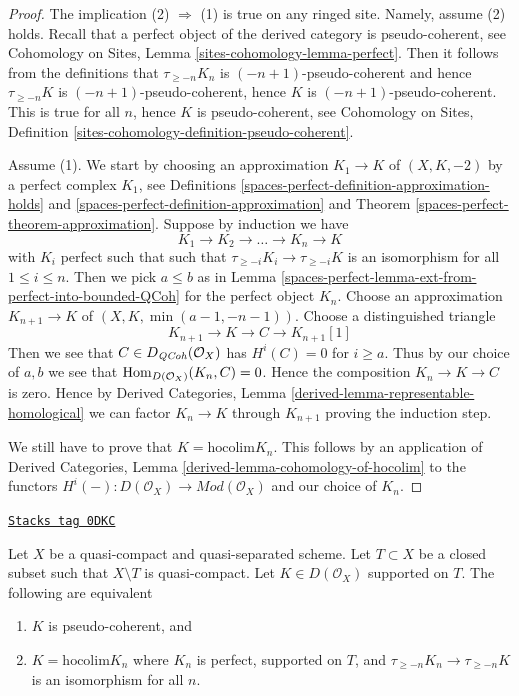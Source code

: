 \begin{proof}
The implication (2) $\Rightarrow$ (1) is true on any ringed site.
Namely, assume (2) holds. Recall that a perfect object of the derived
category is pseudo-coherent, see
Cohomology on Sites, Lemma \ref{sites-cohomology-lemma-perfect}.
Then it follows from the definitions that
$\tau_{\geq -n}K_n$ is $(-n + 1)$-pseudo-coherent
and hence $\tau_{\geq -n}K$ is $(-n + 1)$-pseudo-coherent,
hence $K$ is $(-n + 1)$-pseudo-coherent. This is true for
all $n$, hence $K$ is pseudo-coherent, see
Cohomology on Sites, Definition
\ref{sites-cohomology-definition-pseudo-coherent}.

\medskip\noindent
Assume (1). We start by choosing an approximation
$K_1 \to K$ of $(X, K, -2)$ by a perfect complex $K_1$, see
Definitions \ref{spaces-perfect-definition-approximation-holds} and
\ref{spaces-perfect-definition-approximation} and
Theorem \ref{spaces-perfect-theorem-approximation}.
Suppose by induction we have
$$
K_1 \to K_2 \to \ldots \to K_n \to K
$$
with $K_i$ perfect such that
such that $\tau_{\geq -i}K_i \to \tau_{\geq -i}K$ is an isomorphism
for all $1 \leq i \leq n$. Then we pick $a \leq b$ as in
Lemma \ref{spaces-perfect-lemma-ext-from-perfect-into-bounded-QCoh}
for the perfect object $K_n$. Choose an approximation
$K_{n + 1} \to K$ of $(X, K, \min(a - 1, -n - 1))$.
Choose a distinguished triangle
$$
K_{n + 1} \to K \to C \to K_{n + 1}[1]
$$
Then we see that $C \in D_{\mathit{QCoh}}(\mathcal{O}_X)$ has
$H^i(C) = 0$ for $i \geq a$. Thus by our choice of $a, b$
we see that $\operatorname{Hom}_{D(\mathcal{O}_X)}(K_n, C) = 0$.
Hence the composition $K_n \to K \to C$ is zero. Hence by
Derived Categories, Lemma \ref{derived-lemma-representable-homological}
we can factor $K_n \to K$ through $K_{n + 1}$
proving the induction step.

\medskip\noindent
We still have to prove that $K = \text{hocolim} K_n$.
This follows by an application of
Derived Categories, Lemma \ref{derived-lemma-cohomology-of-hocolim}
to the functors
$H^i( - ) : D(\mathcal{O}_X) \to \textit{Mod}(\mathcal{O}_X)$
and our choice of $K_n$.
\end{proof}

\begin{lemma}
\label{spaces-perfect-lemma-pseudo-coherent-hocolim-with-support}
\href{https://stacks.math.columbia.edu/tag/0DKC}{\texttt{Stacks tag 0DKC}}

Let $X$ be a quasi-compact and quasi-separated scheme.
Let $T \subset X$ be a closed subset such that $X \setminus T$
is quasi-compact. Let $K \in D(\mathcal{O}_X)$ supported on $T$.
The following are equivalent
\begin{enumerate}
\item $K$ is pseudo-coherent, and
\item $K = \text{hocolim} K_n$ where
$K_n$ is perfect, supported on $T$, and
$\tau_{\geq -n}K_n \to \tau_{\geq -n}K$ is an isomorphism for all $n$.
\end{enumerate}
\end{lemma}

